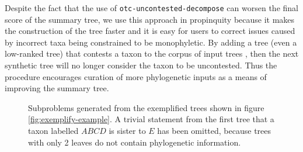 \documentclass[fleqn,12pt,lineno,english]{wlpeerj}
\newcommand{\lyxdot}{.}
\begin{document}
Despite the fact that the use of \texttt{otc-uncontested-decompose}
can worsen the final score of the summary tree, we use this approach
in propinquity because it makes the construction of the tree faster
and it is easy for users to correct issues caused by incorrect taxa
being constrained to be monophyletic. By adding a tree (even a low-ranked
tree) that contests a taxon to the corpus of input trees , then the
next synthetic tree will no longer consider the taxon to be uncontested.
Thus the procedure encourages curation of more phylogenetic inputs
as a means of improving the summary tree. 

\begin{figure}


\caption{Subproblems generated from the exemplified trees shown in figure \ref{fig:exemplify-example}.
A trivial statement from the first tree that a taxon labelled $ABCD$
is sister to $E$ has been omitted, because trees with only 2 leaves
do not contain phylogenetic information.}
\label{fig:subproblems-example}
\end{figure}
\end{document}
